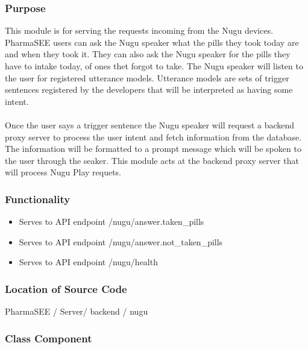 \documentclass[conference]{IEEEtran}
\begin{document}
\subsubsection{Purpose}
This module is for serving the requests incoming from the Nugu devices. PharmaSEE users can ask the Nugu speaker what the pills they took today are and when they took it. They can also ask the Nugu speaker for the pills they have to intake today, of ones thet forgot to take. The Nugu speaker will listen to the user for registered utterance models. Utterance models are sets of trigger sentences registered by the developers that will be interpreted as having some intent. 
\\ \\
Once the user says a trigger sentence the Nugu speaker will request a backend proxy server to process the user intent and fetch information from the database. The information will be formatted to a prompt message which will be spoken to the user through the seaker. This module acts at the backend proxy server that will process Nugu Play requets.
\\
\subsubsection{Functionality}
\begin{itemize}
    \item Serves to API endpoint /nugu/answer.taken\_pills
    \item Serves to API endpoint /nugu/answer.not\_taken\_pills
    \item Serves to API endpoint /nugu/health
\end{itemize}
\bigskip

\subsubsection{Location of Source Code}PharmaSEE / Server/ backend / nugu
\\
\subsubsection{Class Component}
\\
\end{document}
